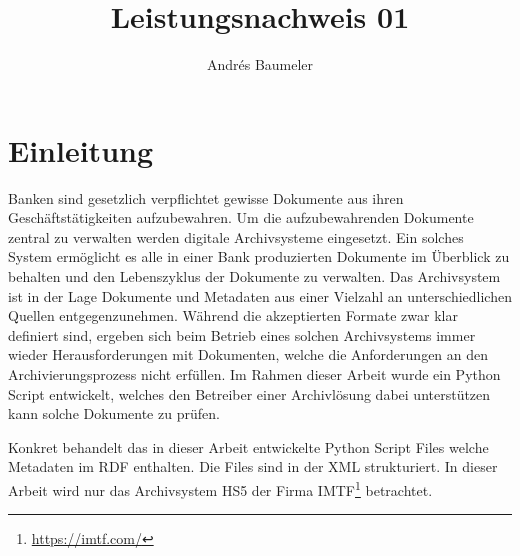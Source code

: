 \documentclass[a4paper,oneside, 12pt]{report}
\title{Leistungsnachweis 01}
\author{Andrés Baumeler}
\begin{document}

\pagestyle{empty} %





\cleardoublepage
\tableofcontents %
\cleardoublepage %

\pagestyle{plain} %



\chapter{Einleitung}\label{sec:motivation}
Banken sind gesetzlich verpflichtet gewisse Dokumente aus ihren Geschäftstätigkeiten aufzubewahren. Um die aufzubewahrenden Dokumente zentral zu verwalten werden digitale Archivsysteme eingesetzt. Ein solches System ermöglicht es alle in einer Bank produzierten Dokumente im Überblick zu behalten und den Lebenszyklus der Dokumente zu verwalten. Das Archivsystem ist in der Lage Dokumente und Metadaten aus einer Vielzahl an unterschiedlichen Quellen entgegenzunehmen. Während die akzeptierten Formate zwar klar definiert sind, ergeben sich beim Betrieb eines solchen Archivsystems immer wieder Herausforderungen mit Dokumenten, welche die Anforderungen an den Archivierungsprozess nicht erfüllen. Im Rahmen dieser Arbeit wurde ein Python Script entwickelt, welches den Betreiber einer Archivlösung dabei unterstützen kann solche Dokumente zu prüfen.

Konkret behandelt das in dieser Arbeit entwickelte Python Script Files welche Metadaten im \ac{RDF} enthalten. Die Files sind in der \ac{XML} strukturiert. In dieser Arbeit wird nur das Archivsystem \ac{HS5} der Firma IMTF\footnote{\url{https://imtf.com/}} betrachtet.
\end{document}
